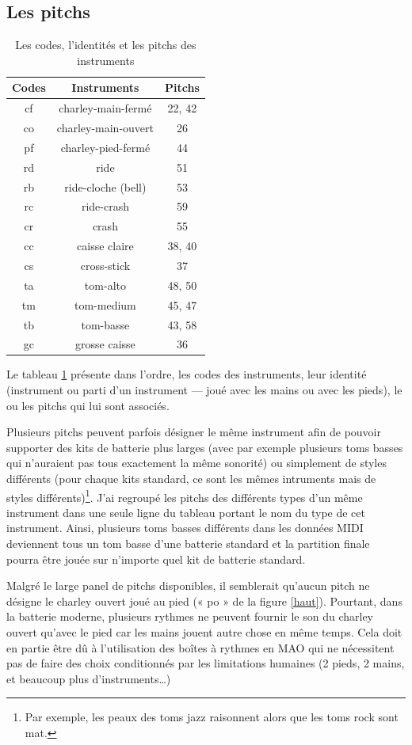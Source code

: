 \subsection*{Les pitchs}
\begin{table}[h]
	\centering
	\begin{tabular}{|c|c|c|} \hline
		Codes & Instruments & Pitchs \\ \hline
		cf & charley-main-fermé & 22, 42 \\
		co & charley-main-ouvert & 26 \\
		pf & charley-pied-fermé & 44 \\
		rd & ride & 51 \\
		rb & ride-cloche (bell) & 53 \\
		rc & ride-crash & 59 \\
		cr & crash & 55 \\
		cc & caisse claire & 38, 40 \\
		cs & cross-stick & 37 \\
		ta & tom-alto & 48, 50 \\
		tm & tom-medium & 45, 47 \\
		tb & tom-basse & 43, 58 \\
		gc & grosse caisse & 36 \\ \hline
	\end{tabular}
	\caption{Les codes, l’identités et les pitchs des instruments}
	\label{pitchs_instru}
\end{table}
Le tableau \ref{pitchs_instru} présente dans l’ordre, les codes des
instruments, leur identité (instrument ou parti d’un instrument — joué avec les
mains ou avec les pieds), le ou les pitchs qui lui sont associés.

Plusieurs pitchs peuvent parfois désigner le même instrument afin de pouvoir
supporter des kits de batterie plus larges (avec par exemple plusieurs toms
basses qui n’auraient pas tous exactement la même sonorité) ou simplement de
styles différents (pour chaque kits standard, ce sont les mêmes intruments mais
de styles différents)\footnote{Par exemple, les peaux des
toms jazz raisonnent alors que les toms rock sont mat.}.
J’ai regroupé les pitchs des différents types d’un même instrument dans une
seule ligne du tableau portant le nom du type de cet instrument. Ainsi,
plusieurs toms basses différents dans les données MIDI deviennent tous un tom
basse d’une batterie standard et la partition finale pourra être jouée sur
n’importe quel kit de batterie standard.

Malgré le large panel de pitchs disponibles, il semblerait qu’aucun pitch ne
désigne le charley ouvert joué au pied (« po » de la figure \ref{haut}).
Pourtant, dans la batterie moderne, plusieurs rythmes ne peuvent fournir le son
du charley ouvert qu’avec le pied car les mains jouent autre chose en même
temps. Cela doit en partie être dû à l’utilisation des boîtes à rythmes
en MAO qui ne nécessitent pas de faire des choix conditionnés par les
limitations humaines (2 pieds, 2 mains, et beaucoup plus d’instruments…)

